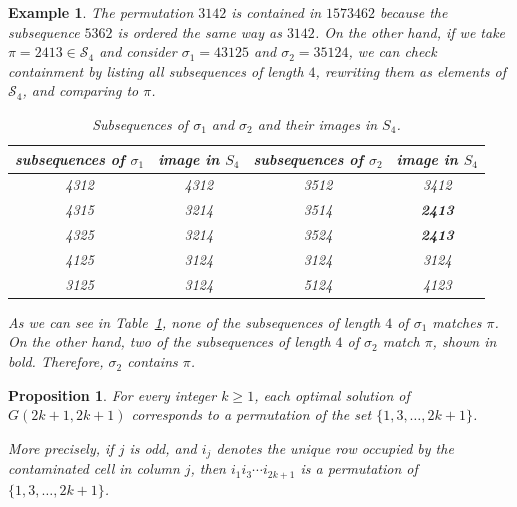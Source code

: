 \documentclass[letterpaper,12pt]{article}
\newtheorem{proposition}{Proposition}
\newtheorem{example}{Example}
\begin{document}
\begin{example} The permutation $3142$ is contained in $1573462$ because the subsequence $5362$ is ordered the same way as $3142$.  
On the other hand, if we take $\pi = 2413 \in \mathcal{S}_4$ and consider $\sigma_{1} = 43125$ and $\sigma_{2} = 35124$, we can check containment by listing all subsequences of length $4$, rewriting them as elements of $\mathcal{S}_4$, and comparing to $\pi$.

\begin{table}[H]
\centering
\begin{tabular}{cc| cc}
\hline
\textit{subsequences of $\sigma_1$} & \textit{image in $S_4$} &
\textit{subsequences of $\sigma_2$} & \textit{image in $S_4$} \\
\hline
4312 & 4312 & 3512 & 3412 \\
4315 & 3214 & 3514 & \textbf{2413} \\
4325 & 3214 & 3524 & \textbf{2413} \\
4125 & 3124 & 3124 & 3124 \\
3125 & 3124 & 5124 & 4123 \\
\hline
\end{tabular}
\caption{Subsequences of $\sigma_1$ and $\sigma_2$ and their images in $S_4$.}
\label{tab:subsequences-images}
\end{table}
 

As we can see in Table~\ref{tab:subsequences-images}, none of the subsequences of length $4$ of $\sigma_1$ matches $\pi$.  
On the other hand, two of the subsequences of length $4$ of $\sigma_2$ match $\pi$, shown in bold.  
Therefore, $\sigma_2$ contains $\pi$.



\end{example}



 


\begin{proposition}\label{prop:odd-square-permutations}
For every integer $k\ge 1$, each optimal solution of $G(2k+1,2k+1)$ corresponds to a permutation
of the set $\{1,3,\dots,2k+1\}$.
 
More precisely, if $j$ is odd, and $i_j$ denotes the unique row occupied by the contaminated cell
in column $j$, then $i_1i_3\cdots i_{2k+1}$ is a permutation of $\{1,3,\dots,2k+1\}$.
\end{proposition}
\end{document}
